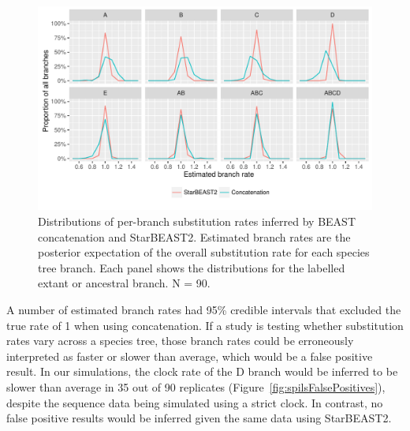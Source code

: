 \documentclass[12pt]{article}
\begin{document}
\begin{figure}[htb!]
\centering
\includegraphics[width=\textwidth]{spils.pdf}
\caption
{Distributions of per-branch substitution rates inferred by BEAST concatenation and StarBEAST2. Estimated branch
rates are the posterior expectation of the overall substitution rate for each
species tree branch. Each panel shows the distributions for the labelled extant or
ancestral branch. N = 90.}
\label{fig:spilsRates}
\end{figure}

A number of estimated branch rates had 95\% credible intervals that excluded the
true rate of 1 when using concatenation. If a study is testing whether substitution rates
vary across a species tree, those branch rates could be erroneously interpreted as faster
or slower than average, which would be a false positive result. In our simulations, the
clock rate of the D branch would be inferred to be slower than average in 35
out of 90 replicates (Figure~\ref{fig:spilsFalsePositives}),
despite the sequence data being simulated using a strict clock. In contrast, no false
positive results would be inferred given the same data using StarBEAST2.
\end{document}
